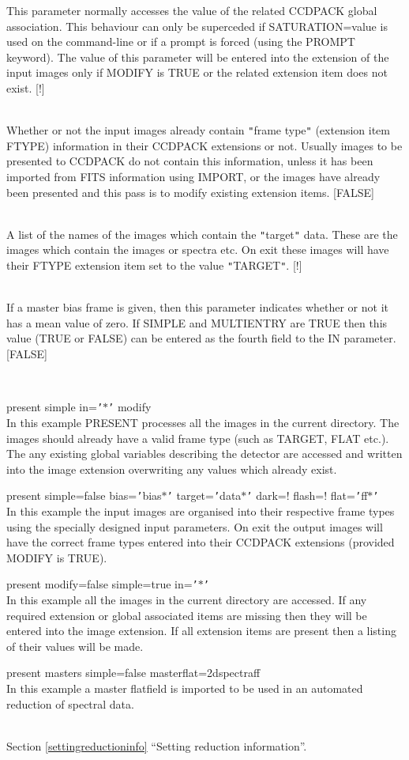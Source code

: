 \documentclass[twoside,11pt]{article}
\newcommand{\htmlref}[2]{#1}
\newcommand{\latexhtml}[2]{#1}
\renewcommand{\_}{\texttt{\symbol{95}}}
\newcommand{\qt}[1]{{\tt "}#1{\tt "}}
\newcommand{\qs}[1]{{\tt '}#1{\tt '}}
\newcommand{\routine}[1]{{\sc #1}}
\newcommand{\xroutine}[1]{\htmlref{{\sc #1}}{#1}}
\newcommand{\secref}[2]{\latexhtml{Section \ref{#1} ``#2''}{``\htmlref{#2}{#1}''}}
\newcommand{\sstexamples}[1]{
   \item[Examples:] \mbox{} \\
   \vspace{-3.5ex}
   \begin{description}
      #1
   \end{description}
}
\newcommand{\sstsubsection}[1]{ \item[{#1}] \mbox{} \\}
\newcommand{\sstexamplesubsection}[2]{\sloppy \item{\ssttt #1} \mbox{} \\ #2 }
\newcommand{\sstdiytopic}[2]{\item[#1:] \mbox{} \\[1.3ex] #2}
\newcommand{\sstexamples}[1]{
      \item[Examples:] \\
      \begin{description}
         #1
      \end{description}
      \\
   }
\newcommand{\sstsubsection}[1]{\item[{#1}]}
\newcommand{\sstexamplesubsection}[2]{\item[{\ssttt #1}] #2}
\newcommand{\sstdiytopic}[2]{\item[{#1:}] #2 }
\begin{document}
{{{         This parameter normally accesses the value of the related
         CCDPACK global association. This behaviour can only be
         superceded if SATURATION=value is used on the command-line
         or if a prompt is forced (using the PROMPT keyword). The
         value of this parameter will be entered into the extension of
         the input images only if MODIFY is TRUE or the related extension
         item does not exist.
         [!]
      }
      \sstsubsection{
         SIMPLE = \_LOGICAL (Read)
      } {
         Whether or not the input images already contain \qt{frame type}
         (extension item FTYPE) information in their CCDPACK extensions
         or not. Usually images to be presented to CCDPACK do not contain
         this information, unless it has been imported from FITS
         information using \xroutine{IMPORT}, or the images have already been
         presented and this pass is to modify existing extension items.
         [FALSE]
      }
      \sstsubsection{
         TARGET = LITERAL (Read)
      } {
         A list of the names of the images which contain the \qt{target}
         data. These are the images which contain the images or spectra
         etc.  On exit these images will have their FTYPE extension item
         set to the value \qt{TARGET}.
         [!]
      }
      \sstsubsection{
         ZEROED = \_LOGICAL (Read)
      } {
         If a master bias frame is given, then this parameter indicates
         whether or not it has a mean value of zero. If SIMPLE and
         MULTIENTRY are TRUE then this value (TRUE or FALSE) can be entered
         as the fourth field to the IN parameter.
         [FALSE]
      }
   }
\newpage
   \sstexamples{
      \sstexamplesubsection{
         present simple in=\qs{$*$} modify
      } {
         In this example \routine{PRESENT} processes all the images in the current
         directory. The images should already have a valid frame type
         (such as TARGET, FLAT etc.). The any existing global variables
         describing the detector are accessed and written into the image
         extension overwriting any values which already exist.
      }
      \sstexamplesubsection{
         present simple=false bias=\qs{bias$*$} target=\qs{data$*$}
                 dark=! flash=! flat=\qs{ff$*$}
      } {
         In this example the input images are organised into their
         respective frame types using the specially designed input
         parameters. On exit the output images will have the correct frame
         types entered into their CCDPACK extensions (provided MODIFY
         is TRUE).
      }
      \sstexamplesubsection{
         present modify=false simple=true in=\qs{$*$}
      } {
         In this example all the images in the current directory are
         accessed. If any required extension or global associated items
         are missing then they will be entered into the image extension.
         If all extension items are present then a listing of their
         values will be made.
      }
      \sstexamplesubsection{
         present masters simple=false masterflat=2dspectraff
      } {
         In this example a master flatfield is imported to be used
         in an automated reduction of spectral data.
      }
   }
   \sstdiytopic{
      See also
   } {
      \secref{settingreductioninfo}{Setting reduction information}.
   }
}
\end{document}
